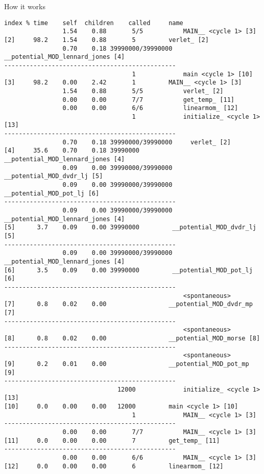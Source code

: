 \documentclass[10pt,t]{beamer}
\begin{document}
\begin{frame}{How it works}
\begin{itemize}
\begin{lstlisting}
index % time    self  children    called     name
                1.54    0.88       5/5           MAIN__ <cycle 1> [3]
[2]     98.2    1.54    0.88       5         verlet_ [2]
                0.70    0.18 39990000/39990000     __potential_MOD_lennard_jones [4]
-----------------------------------------------
                                   1             main <cycle 1> [10]
[3]     98.2    0.00    2.42       1         MAIN__ <cycle 1> [3]
                1.54    0.88       5/5           verlet_ [2]
                0.00    0.00       7/7           get_temp_ [11]
                0.00    0.00       6/6           linearmom_ [12]
                                   1             initialize_ <cycle 1> [13]
-----------------------------------------------
                0.70    0.18 39990000/39990000     verlet_ [2]
[4]     35.6    0.70    0.18 39990000         __potential_MOD_lennard_jones [4]
                0.09    0.00 39990000/39990000     __potential_MOD_dvdr_lj [5]
                0.09    0.00 39990000/39990000     __potential_MOD_pot_lj [6]
-----------------------------------------------
                0.09    0.00 39990000/39990000     __potential_MOD_lennard_jones [4]
[5]      3.7    0.09    0.00 39990000         __potential_MOD_dvdr_lj [5]
-----------------------------------------------
                0.09    0.00 39990000/39990000     __potential_MOD_lennard_jones [4]
[6]      3.5    0.09    0.00 39990000         __potential_MOD_pot_lj [6]
-----------------------------------------------
                                                 <spontaneous>
[7]      0.8    0.02    0.00                 __potential_MOD_dvdr_mp [7]
-----------------------------------------------
                                                 <spontaneous>
[8]      0.8    0.02    0.00                 __potential_MOD_morse [8]
-----------------------------------------------
                                                 <spontaneous>
[9]      0.2    0.01    0.00                 __potential_MOD_pot_mp [9]
-----------------------------------------------
                               12000             initialize_ <cycle 1> [13]
[10]     0.0    0.00    0.00   12000         main <cycle 1> [10]
                                   1             MAIN__ <cycle 1> [3]
-----------------------------------------------
                0.00    0.00       7/7           MAIN__ <cycle 1> [3]
[11]     0.0    0.00    0.00       7         get_temp_ [11]
-----------------------------------------------
                0.00    0.00       6/6           MAIN__ <cycle 1> [3]
[12]     0.0    0.00    0.00       6         linearmom_ [12]

\end{lstlisting}
\end{itemize}
\end{frame}
\end{document}
